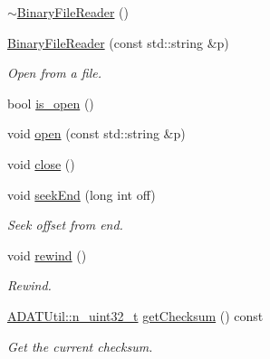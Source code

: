 \begin{DoxyCompactItemize}
\item 
\mbox{\hyperlink{classADATIO_1_1BinaryFileReader_aa0905fcdd1723ce850a89baf9a111345}{$\sim$\+Binary\+File\+Reader}} ()
\item 
\mbox{\hyperlink{classADATIO_1_1BinaryFileReader_a987273f138d0fcc4a1e9a95c51b093ef}{Binary\+File\+Reader}} (const std\+::string \&p)
\begin{DoxyCompactList}\small\item\em Open from a file. \end{DoxyCompactList}\item 
bool \mbox{\hyperlink{classADATIO_1_1BinaryFileReader_a679fa9d101de2993355f4dd193d4f64d}{is\+\_\+open}} ()
\item 
void \mbox{\hyperlink{classADATIO_1_1BinaryFileReader_a5a7c5bb025902fd04642fb154542dc6a}{open}} (const std\+::string \&p)
\item 
void \mbox{\hyperlink{classADATIO_1_1BinaryFileReader_af0501cb948e5220209226970867dbb26}{close}} ()
\item 
void \mbox{\hyperlink{classADATIO_1_1BinaryFileReader_a1ae70d2eb56f1c1b1769ce9557f8ebbf}{seek\+End}} (long int off)
\begin{DoxyCompactList}\small\item\em Seek offset from end. \end{DoxyCompactList}\item 
void \mbox{\hyperlink{classADATIO_1_1BinaryFileReader_a4f15e41f00be97ad3a0e8bb97c90b704}{rewind}} ()
\begin{DoxyCompactList}\small\item\em Rewind. \end{DoxyCompactList}\item 
\mbox{\hyperlink{namespaceADATUtil_ad945a8afa4db2d1f89b731964adae97e}{A\+D\+A\+T\+Util\+::n\+\_\+uint32\+\_\+t}} \mbox{\hyperlink{classADATIO_1_1BinaryFileReader_addb0cfdf4c3df174327b1abc136cfc68}{get\+Checksum}} () const
\begin{DoxyCompactList}\small\item\em Get the current checksum. \end{DoxyCompactList}\end{DoxyCompactItemize}
